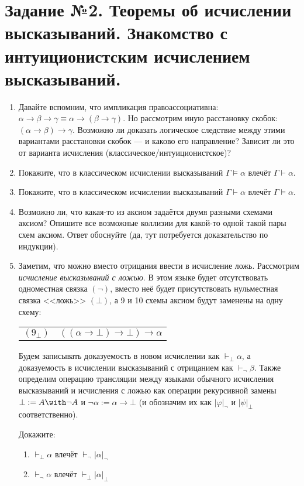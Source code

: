 \documentclass[10pt,a4paper,oneside]{article}
\begin{document}
\section*{Задание №2. Теоремы об исчислении высказываний. Знакомство с интуиционистским исчислением высказываний.}
\begin{enumerate}
\item Давайте вспомним, что импликация правоассоциативна: $\alpha\rightarrow\beta\rightarrow\gamma \equiv \alpha\rightarrow(\beta\rightarrow\gamma)$.
Но рассмотрим иную расстановку скобок: $(\alpha\rightarrow\beta)\rightarrow\gamma$. Возможно ли доказать логическое следствие
между этими вариантами расстановки скобок --- и каково его направление? Зависит ли это от варианта исчисления (классическое/интуиционистское)?
\item Покажите, что в классическом исчислении высказываний $\Gamma \models \alpha$ влечёт $\Gamma \vdash \alpha$.
\item Покажите, что в классическом исчислении высказываний $\Gamma \vdash \alpha$ влечёт $\Gamma \models \alpha$.
\item Возможно ли, что какая-то из аксиом задаётся двумя разными схемами аксиом? Опишите все возможные коллизии для какой-то одной такой пары схем аксиом.
Ответ обоснуйте (да, тут потребуется доказательство по индукции).

\item Заметим, что можно вместо отрицания ввести в исчисление ложь. Рассмотрим \emph{исчисление высказываний с ложью}.
В этом языке будет отсутствовать одноместная связка $(\neg)$, вместо неё будет присутствовать нульместная
связка <<ложь>> $(\bot)$, а 9 и 10 схемы аксиом будут заменены на одну схему:

\begin{tabular}{ll}
$(9_\bot)$ & $((\alpha\rightarrow\bot)\rightarrow\bot)\rightarrow\alpha$
\end{tabular}

Будем записывать доказуемость в новом исчислении как $\vdash_\bot \alpha$, а доказуемость в исчислении высказываний
с отрицанием как $\vdash_\neg \beta$. Также определим операцию трансляции между языками обычного исчисления высказываний и исчисления с ложью
как операции рекурсивной замены $\bot := A \with \neg A$ и $\neg \alpha := \alpha \rightarrow \bot$ (и обозначим их
как $|\varphi|_\neg$ и $|\psi|_\bot$ соответственно).

Докажите:
\begin{enumerate}
\item $\vdash_\bot \alpha$ влечёт $\vdash_\neg |\alpha|_\neg$
\item $\vdash_\neg \alpha$ влечёт $\vdash_\bot |\alpha|_\bot$
\end{enumerate}


\end{enumerate}
\end{document}
